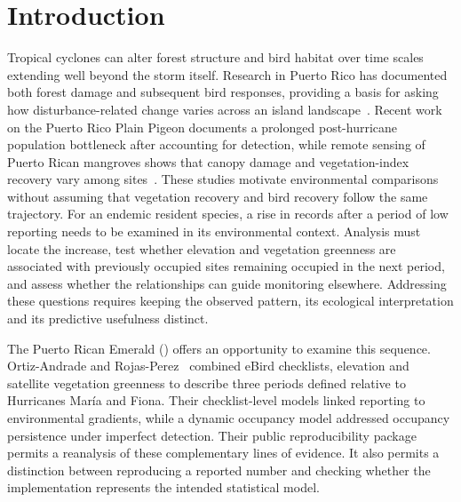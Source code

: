 \section{Introduction}
Tropical cyclones can alter forest structure and bird habitat over time scales extending well beyond the storm itself. Research in Puerto Rico has documented both forest damage and subsequent bird responses, providing a basis for asking how disturbance-related change varies across an island landscape~\cite{uriarte2019,wunderle1995}. Recent work on the Puerto Rico Plain Pigeon documents a prolonged post-hurricane population bottleneck after accounting for detection, while remote sensing of Puerto Rican mangroves shows that canopy damage and vegetation-index recovery vary among sites~\cite{rivera2025,howe2025}. These studies motivate environmental comparisons without assuming that vegetation recovery and bird recovery follow the same trajectory. For an endemic resident species, a rise in records after a period of low reporting needs to be examined in its environmental context. Analysis must locate the increase, test whether elevation and vegetation greenness are associated with previously occupied sites remaining occupied in the next period, and assess whether the relationships can guide monitoring elsewhere. Addressing these questions requires keeping the observed pattern, its ecological interpretation and its predictive usefulness distinct.

The Puerto Rican Emerald (\Rm) offers an opportunity to examine this sequence. Ortiz-Andrade and Rojas-Perez~\cite{ortiz2026} combined eBird checklists, elevation and satellite vegetation greenness to describe three periods defined relative to Hurricanes Mar\'ia and Fiona. Their checklist-level models linked reporting to environmental gradients, while a dynamic occupancy model addressed occupancy persistence under imperfect detection. Their public reproducibility package permits a reanalysis of these complementary lines of evidence. It also permits a distinction between reproducing a reported number and checking whether the implementation represents the intended statistical model.

